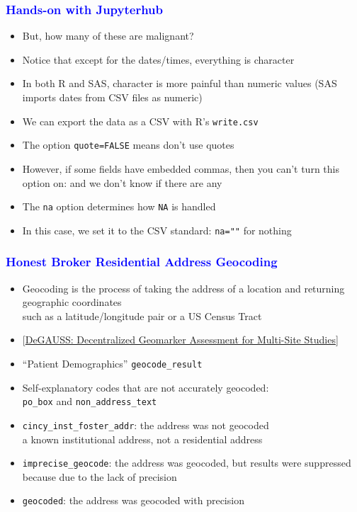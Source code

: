 \documentclass[11pt,pdftex,dvipsnames,usenames]{beamer}
\begin{document}
\begin{frame}[fragile]\frametitle{\bf\textcolor{blue}{Hands-on with Jupyterhub}}
\begin{itemize}
\item But, how many of these are malignant?
\item Notice that except for the dates/times,
everything is character
\item In both R and SAS, character is more painful than numeric
values (SAS imports dates from CSV files as numeric)
\item We can export the data as a CSV with R's \texttt{write.csv}
\item The option \texttt{quote=FALSE} means don't use quotes
\item However, if some fields have embedded commas, then you
can't turn this option on: and we don't know if there are any
\item The \texttt{na} option determines how \texttt{NA} is handled
\item In this case, we set it to the CSV standard: \texttt{na=""}
for nothing 
\end{itemize}

\end{frame}



\begin{frame}[fragile]\frametitle{\bf\textcolor{blue}{Honest Broker Residential
Address Geocoding}}
\begin{itemize}
\item Geocoding is the process of taking the address of a location and
  returning geographic coordinates\\
 such as a latitude/longitude pair or a US Census Tract
\item  
\textcolor{PineGreen}{[\href{https://degauss.org}{DeGAUSS:
    Decentralized Geomarker Assessment for Multi-Site Studies}]}
\item ``Patient Demographics'' \texttt{geocode\_result}
\item Self-explanatory codes that are not accurately geocoded:\\ 
\texttt{po\_box} and \texttt{non\_address\_text} 
\item \texttt{cincy\_inst\_foster\_addr}: the address was not geocoded \\ 
a known institutional address, not a residential address
\item \texttt{imprecise\_geocode}: the address was geocoded, but results were suppressed because due to the lack of precision
\item \texttt{geocoded}: the address was geocoded with precision
\end{itemize}
\end{frame}
\end{document}
